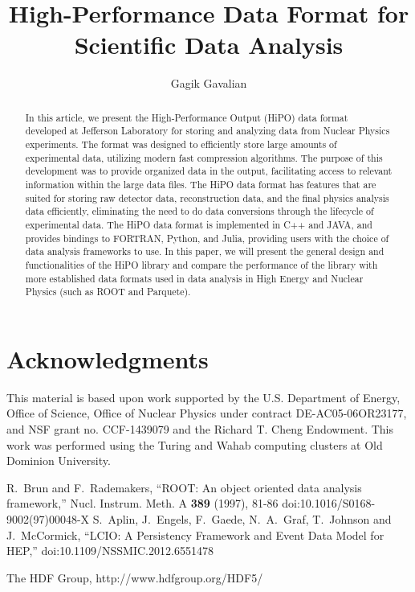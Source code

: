 \documentclass[preprint,12pt]{elsarticle}
\title{High-Performance Data Format for Scientific Data Analysis}
\author[1]{Gagik Gavalian}
\begin{document}
\begin{abstract}
In this article, we present the High-Performance Output (HiPO) data format developed at Jefferson Laboratory for 
storing and analyzing data from Nuclear Physics experiments. The format was designed to efficiently store large
amounts of experimental data, utilizing modern fast compression algorithms. The purpose of this development was 
to provide organized data in the output, facilitating access to relevant information within the large data files. The HiPO
data format has features that are suited for storing raw detector data, reconstruction data, and the final physics analysis 
data efficiently, eliminating the need to do data conversions through the lifecycle of experimental data. The HiPO data format
is implemented in C++ and JAVA, and provides bindings to FORTRAN, Python, and Julia, providing users with the choice of data 
analysis frameworks to use.
In this paper, we will present the general design and functionalities of the HiPO library and compare the performance of the library with
 more established data formats used in data analysis in High Energy and Nuclear Physics (such as ROOT and Parquete).

\end{abstract}
\maketitle










\newpage

\section{Acknowledgments}

This material is based upon work supported by the U.S. Department of Energy, Office of Science,
Office of Nuclear Physics under contract DE-AC05-06OR23177, and NSF grant no. CCF-1439079 and
the Richard T. Cheng Endowment. This work was performed using the Turing and Wahab computing
clusters at Old Dominion University.
 
 
\begin{thebibliography}{}
R.~Brun and F.~Rademakers,
``ROOT: An object oriented data analysis framework,''
Nucl. Instrum. Meth. A \textbf{389} (1997), 81-86
doi:10.1016/S0168-9002(97)00048-X
S.~Aplin, J.~Engels, F.~Gaede, N.~A.~Graf, T.~Johnson and J.~McCormick,
``LCIO: A Persistency Framework and Event Data Model for HEP,''
doi:10.1109/NSSMIC.2012.6551478

The HDF Group,  http://www.hdfgroup.org/HDF5/


\end{thebibliography}
%
%
\end{document}
